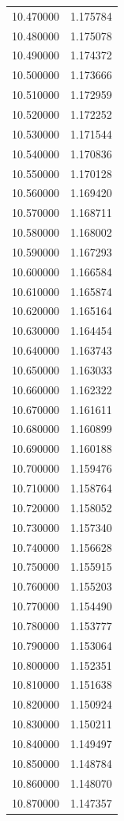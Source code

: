\begin{tabular}{rr}
10.470000 & 1.175784 \\
10.480000 & 1.175078 \\
10.490000 & 1.174372 \\
10.500000 & 1.173666 \\
10.510000 & 1.172959 \\
10.520000 & 1.172252 \\
10.530000 & 1.171544 \\
10.540000 & 1.170836 \\
10.550000 & 1.170128 \\
10.560000 & 1.169420 \\
10.570000 & 1.168711 \\
10.580000 & 1.168002 \\
10.590000 & 1.167293 \\
10.600000 & 1.166584 \\
10.610000 & 1.165874 \\
10.620000 & 1.165164 \\
10.630000 & 1.164454 \\
10.640000 & 1.163743 \\
10.650000 & 1.163033 \\
10.660000 & 1.162322 \\
10.670000 & 1.161611 \\
10.680000 & 1.160899 \\
10.690000 & 1.160188 \\
10.700000 & 1.159476 \\
10.710000 & 1.158764 \\
10.720000 & 1.158052 \\
10.730000 & 1.157340 \\
10.740000 & 1.156628 \\
10.750000 & 1.155915 \\
10.760000 & 1.155203 \\
10.770000 & 1.154490 \\
10.780000 & 1.153777 \\
10.790000 & 1.153064 \\
10.800000 & 1.152351 \\
10.810000 & 1.151638 \\
10.820000 & 1.150924 \\
10.830000 & 1.150211 \\
10.840000 & 1.149497 \\
10.850000 & 1.148784 \\
10.860000 & 1.148070 \\
10.870000 & 1.147357 \\

\end{tabular}
